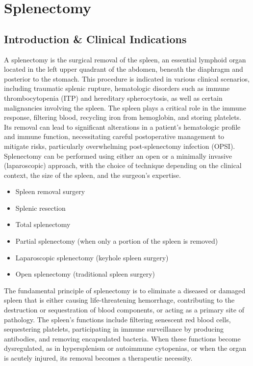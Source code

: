 \chapter{Splenectomy}

\section*{Introduction \& Clinical Indications}
A splenectomy is the surgical removal of the spleen, an essential lymphoid organ located in the left upper quadrant of the abdomen, beneath the diaphragm and posterior to the stomach. This procedure is indicated in various clinical scenarios, including traumatic splenic rupture, hematologic disorders such as immune thrombocytopenia (ITP) and hereditary spherocytosis, as well as certain malignancies involving the spleen. The spleen plays a critical role in the immune response, filtering blood, recycling iron from hemoglobin, and storing platelets. Its removal can lead to significant alterations in a patient's hematologic profile and immune function, necessitating careful postoperative management to mitigate risks, particularly overwhelming post-splenectomy infection (OPSI). Splenectomy can be performed using either an open or a minimally invasive (laparoscopic) approach, with the choice of technique depending on the clinical context, the size of the spleen, and the surgeon's expertise.

\begin{itemize}
  \item Spleen removal surgery
  \item Splenic resection
  \item Total splenectomy
  \item Partial splenectomy (when only a portion of the spleen is removed)
  \item Laparoscopic splenectomy (keyhole spleen surgery)
  \item Open splenectomy (traditional spleen surgery)
\end{itemize}

The fundamental principle of splenectomy is to eliminate a diseased or damaged spleen that is either causing life-threatening hemorrhage, contributing to the destruction or sequestration of blood components, or acting as a primary site of pathology. The spleen's functions include filtering senescent red blood cells, sequestering platelets, participating in immune surveillance by producing antibodies, and removing encapsulated bacteria. When these functions become dysregulated, as in hypersplenism or autoimmune cytopenias, or when the organ is acutely injured, its removal becomes a therapeutic necessity.


